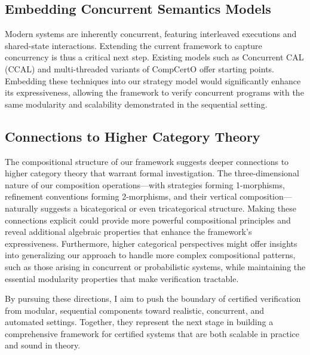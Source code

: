 \subsection{Embedding Concurrent Semantics Models}

Modern systems are inherently concurrent,
featuring interleaved executions and
shared-state interactions.
Extending the current framework to capture concurrency is
thus a critical next step.
Existing models such as Concurrent CAL (CCAL) \citep{ccal}
and multi-threaded variants of CompCertO \citep{compcertoc}
offer starting points.
Embedding these techniques
into our strategy model would significantly
enhance its expressiveness,
allowing the framework
to verify concurrent programs
with the same modularity and scalability demonstrated
in the sequential setting.

\subsection{Connections to Higher Category Theory}

The compositional structure of our framework suggests
deeper connections to higher category theory
that warrant formal investigation.
The three-dimensional nature of our composition operations---with strategies
forming 1-morphisms, refinement conventions
forming 2-morphisms,
and their vertical composition---naturally suggests
a bicategorical or even tricategorical structure.
Making these connections explicit
could provide more powerful compositional principles
and reveal additional algebraic properties
that enhance the framework's expressiveness.
Furthermore, higher categorical perspectives
might offer insights into generalizing our approach
to handle more complex compositional patterns,
such as those arising
in concurrent or probabilistic systems,
while maintaining the essential modularity properties
that make verification tractable.

By pursuing these directions,
I aim to push the boundary of certified verification
from modular, sequential components
toward realistic, concurrent, and automated settings.
Together, they represent the next stage
in building a comprehensive framework
for certified systems that are both scalable in practice
and sound in theory.
